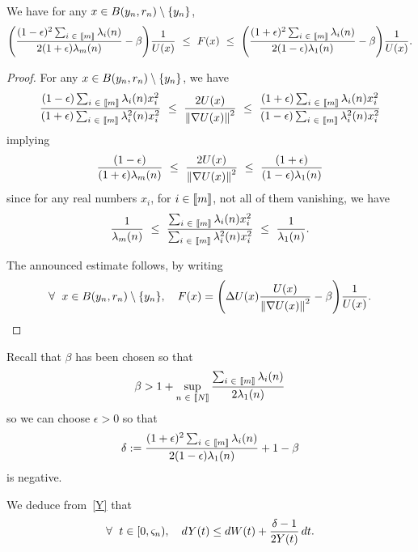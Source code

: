 \documentclass[AHL,Unicode,longabstracts,published]{cedram}
\newcommand{\f}[2]{\frac{#1}{#2}}
\newcommand{\na}{\nabla}
\newcommand{\tr}{\Delta}
\newcommand{\fo}{\forall\ }
\let\originalleft\left
\let\originalright\right
\renewcommand{\left}{\mathopen{}\mathclose\bgroup\originalleft}
\renewcommand{\right}{\aftergroup\egroup\originalright}
\let\oldin\in
\renewcommand{\in}{\mathchoice{\oldin}{\oldin}{\,\oldin\,}{\,\oldin\,}}
\let\oldforall\forall
\renewcommand*{\forall}{\mathrel{\oldforall}}
\newcommand{\llbracket}{\mathopen{[\mkern -2.7mu[}}
\newcommand{\rrbracket}{\mathclose{]\mkern -2.7mu]}}
\newcommand{\lin}{\llbracket}
\newcommand{\rin}{\rrbracket}
\begin{document}
\begin{lemm}\label{comp}
We have for any $x\in B(y_n,r_n)\setminus\{y_n\}$,
\begin{equation*}
\left(\f{(1-\epsilon)^2\sum_{i\in\lin m\rin}\lambda_i(n)}{2(1+\epsilon)\lambda_m(n)}-\beta\right)\f{1}{{U(x)}}\ \leq \ F(x)\ \leq \ \left(\f{(1+\epsilon)^2\sum_{i\in\lin m\rin}\lambda_i(n)}{2(1-\epsilon)\lambda_1(n)}-\beta\right)\f{1}{{U(x)}}.
\end{equation*}
\end{lemm}
\begin{proof}
For any $ x\in B(y_n,r_n)\setminus\{y_n\}$, we have
\begin{equation*}
\f{(1-\epsilon)\sum_{i\in\lin m\rin}\lambda_i(n)x_i^2}{(1+\epsilon)\sum_{i\in\lin m\rin}\lambda_i^2(n)x_i^2}\ \leq \ \f{2U(x)}{\left\| \na U(x)\right\|^2}\ \leq \ \f{(1+\epsilon)\sum_{i\in\lin m\rin}\lambda_i(n)x_i^2}{(1-\epsilon)\sum_{i\in\lin m\rin}\lambda_i^2(n)x_i^2}
\end{equation*}
implying
\begin{equation*}
\f{(1-\epsilon)}{(1+\epsilon)\lambda_m(n)}\ \leq \ \f{2U(x)}{\left\| \na U(x)\right\|^2}\ \leq \ \f{(1+\epsilon)}{(1-\epsilon)\lambda_1(n)}
\end{equation*}
since for any real numbers $x_i$, for $i\in\lin m\rin$, not all of them vanishing, we have
\begin{equation*}
\f1{\lambda_m(n)}\ \leq \ \f{\sum_{i\in\lin m\rin}\lambda_i(n)x_i^2}{\sum_{i\in\lin m\rin}\lambda_i^2(n)x_i^2}\ \leq \ \f1{\lambda_1(n)}.
\end{equation*}


The announced estimate follows, by writing
\begin{equation*}
\fo x\in B(y_n,r_n)\setminus\{y_n\},\quad F(x) = \left(\tr U(x)\f{U(x)}{\left\| \na U(x)\right\|^2}-\beta\right)\f{1}{U(x)}.\qedhere
\end{equation*}
\end{proof}


Recall that $\beta$ has been chosen so that
\begin{equation*}
\beta > 1+\sup_{n\in\lin N\rin}\f{\sum_{i\in\lin m\rin}\lambda_i(n)}{2\lambda_1(n)}
\end{equation*}
so we can choose $\epsilon>0$ so that
\begin{equation*}
\delta := 
\f{(1+\epsilon)^2\sum_{i\in\lin m\rin}\lambda_i(n)}{2(1-\epsilon)\lambda_1(n)}+1-\beta
\end{equation*}
is negative.


We deduce from~\eqref{Y} that
\begin{equation}\label{dYleq}
\fo t\in[0,\varsigma_n),\quad dY(t) \leq dW(t)+\f{\delta-1}{2Y(t)}\,dt.
\end{equation}
\end{document}
